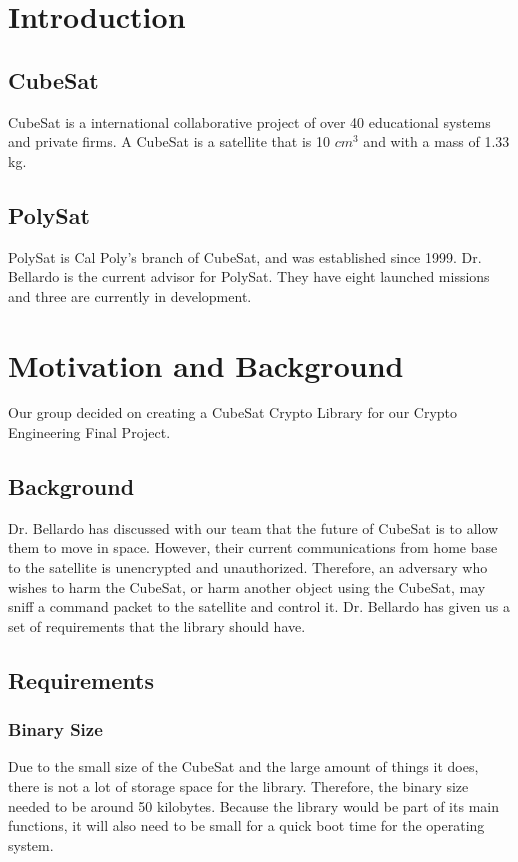 \documentclass[12pt]{article}
\begin{document}
\begin{multicols}{2}
\section{Introduction}
\subsection{CubeSat}
CubeSat is a international collaborative project of over 40 educational systems and private firms. A CubeSat is a satellite that is 10 $cm^{3}$ and with a mass of 1.33 kg. \cite{CubeSat}
\subsection{PolySat}
PolySat is Cal Poly’s branch of CubeSat, and was established since 1999. Dr. Bellardo is the current advisor for PolySat. They have eight launched missions and three are currently in development. \cite{PolySat}
\section{Motivation and Background}
Our group decided on creating a CubeSat Crypto Library for our Crypto Engineering Final Project. 
\subsection{Background}
Dr. Bellardo has discussed with our team that the future of CubeSat is to allow them to move in space. However, their current communications from home base to the satellite is unencrypted and unauthorized.  Therefore, an adversary who wishes to harm the CubeSat, or harm another object using the CubeSat, may sniff a command packet to the satellite and control it. Dr. Bellardo has given us a set of requirements that the library should have.
\subsection{Requirements}
\subsubsection{Binary Size}
Due to the small size of the CubeSat and the large amount of things it does, there is not a lot of storage space for the library. Therefore, the binary size needed to be around 50 kilobytes. Because the library would be part of its main functions, it will also need to be small for a quick boot time for the operating system. 

\end{multicols}
\end{document}
